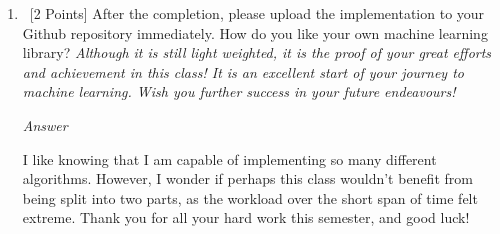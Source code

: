 \documentclass[12pt, fullpage,letterpaper]{article}
\begin{document}
\begin{enumerate}
	\item~[2 Points]  After the completion, please upload the implementation to your Github repository immediately.  How do you like your own machine learning library? \textit{Although it is still light weighted, it is the proof of  your great efforts and achievement  in this class! It is an excellent start of your journey to machine learning.  Wish you further success in your future endeavours!}
	
	\emph{Answer}
	
	I like knowing that I am capable of implementing so many different algorithms. However, I wonder if perhaps this class wouldn't benefit from being split into two parts, as the workload over the short span of time felt extreme. Thank you for all your hard work this semester, and good luck!
	
\end{enumerate}
\end{document}
